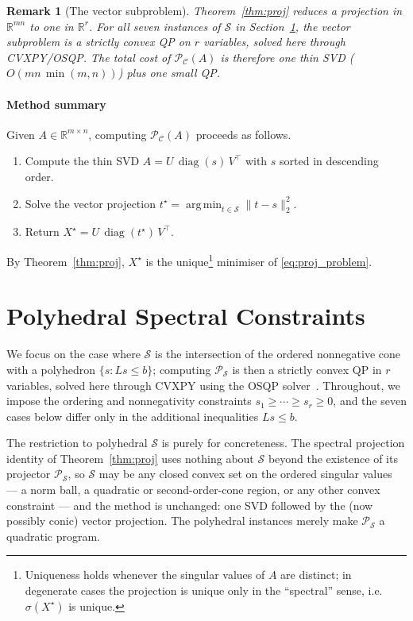\documentclass[journal]{IEEEtran}
\newtheorem{remark}[theorem]{Remark}
\DeclareMathOperator{\diag}{diag}
\DeclareMathOperator*{\argmin}{arg\,min}
\newcommand{\R}{\mathbb{R}}
\newcommand{\sgm}{\sigma}
\newcommand{\proj}{\mathcal{P}}
\newcommand{\spec}{\mathcal{S}}
\newcommand{\Cset}{\mathcal{C}}
\begin{document}
\begin{remark}[The vector subproblem]
Theorem~\ref{thm:proj} reduces a projection in $\R^{mn}$ to one in
$\R^r$. For all seven instances of $\spec$ in
Section~\ref{sec:polyhedral}, the vector subproblem is a strictly
convex QP on $r$ variables, solved here through CVXPY/OSQP. The total
cost of $\proj_\Cset(A)$ is therefore one thin SVD ($O(mn\,\min(m,n))$)
plus one small QP. \newline 
\end{remark}

\paragraph*{Method summary}
Given $A \in \R^{m\times n}$, computing $\proj_\Cset(A)$ proceeds as
follows.
\begin{enumerate}
\item Compute the thin SVD $A = U\,\diag(s)\,V^\top$ with $s$ sorted in
      descending order.
\item Solve the vector projection
      $t^\star = \argmin_{t \in \spec}\|t - s\|_2^2$.
\item Return $X^\star = U\,\diag(t^\star)\,V^\top$.
\end{enumerate}
By Theorem~\ref{thm:proj}, $X^\star$ is the unique\footnote{Uniqueness
holds whenever the singular values of $A$ are distinct; in degenerate
cases the projection is unique only in the ``spectral'' sense, i.e.\
$\sgm(X^\star)$ is unique.} minimiser of \eqref{eq:proj_problem}.

\section{Polyhedral Spectral Constraints}\label{sec:polyhedral}

We focus on the case where $\spec$ is the intersection of the ordered
nonnegative cone with a polyhedron $\{s : Ls \le b\}$; computing
$\proj_\spec$ is then a strictly convex QP in $r$ variables, solved here
through CVXPY using the OSQP solver~\cite{osqp}. Throughout, we impose
the ordering and nonnegativity constraints $s_1 \ge \cdots \ge s_r \ge 0$,
and the seven cases below differ only in the additional inequalities
$Ls \le b$.

The restriction to polyhedral $\spec$ is purely for concreteness. The
spectral projection identity of Theorem~\ref{thm:proj} uses nothing
about $\spec$ beyond the existence of its projector $\proj_\spec$, so
$\spec$ may be any closed convex set on the ordered singular values --- a
norm ball, a quadratic or second-order-cone region, or any other convex
constraint --- and the method is unchanged: one SVD followed by the
(now possibly conic) vector projection. The polyhedral instances merely
make $\proj_\spec$ a quadratic program.
\end{document}

